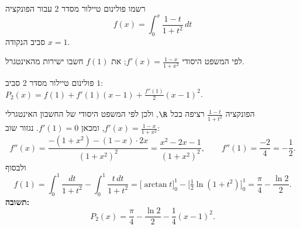 
\begin{question}
רשמו פולינום טיילור מסדר 2 עבור הפונקציה
\[ f(x)=\int_0^x\frac{1-t}{1+t^2}\,dt \]
סביב הנקודה $x=1$.
\end{question}

\begin{hint}
לפי המשפט היסודי $f'(x)=\frac{1-x}{1+x^2}$; את $f(1)$ חשבו ישירות מהאינטגרל.
\end{hint}

\begin{solution}
פולינום טיילור מסדר 2 סביב $1$: $P_2(x)=f(1)+f'(1)(x-1)+\frac{f''(1)}{2}(x-1)^2$.

הפונקציה $\frac{1-t}{1+t^2}$ רציפה בכל $\R$, ולכן לפי המשפט היסודי של החשבון האינטגרלי $f'(x)=\frac{1-x}{1+x^2}$, ומכאן $f'(1)=0$. נגזור שוב:
\[ f''(x)=\frac{-(1+x^2)-(1-x)\cdot2x}{(1+x^2)^2}=\frac{x^2-2x-1}{(1+x^2)^2},\qquad f''(1)=\frac{-2}{4}=-\frac12. \]
ולבסוף
\[ f(1)=\int_0^1\frac{dt}{1+t^2}-\int_0^1\frac{t\,dt}{1+t^2}=\Big[\arctan t\Big]_0^1-\Big[\tfrac12\ln(1+t^2)\Big]_0^1=\frac\pi4-\frac{\ln2}{2}. \]
\textbf{תשובה:}
\[ P_2(x)=\frac\pi4-\frac{\ln2}{2}-\frac14(x-1)^2. \]
\end{solution}
